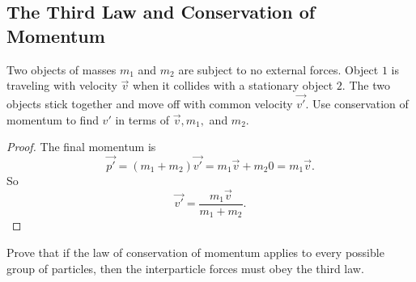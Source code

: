 
\subsection{The Third Law and Conservation of Momentum}

\begin{tcolorbox}[title=Problem 30, breakable]
    Two objects of masses $m_1$ and $m_2$
    are subject to no external forces. Object $1$
    is traveling with velocity $\vec{v}$ when 
    it collides with a stationary object $2$.
    The two objects stick together and move off 
    with common velocity $\vec{v'}$.
    Use conservation of momentum to find $v'$ in terms of $\vec{v},
    m_1,$ and $m_2$.
\end{tcolorbox}

\begin{proof}
    The final momentum is 
    \[\vec{p'} = (m_1 + m_2) \vec{v'} = m_1 \vec{v} + m_2 0 = m_1 \vec{v}.\]
    So 
    \[\vec{v'} = \frac{m_1 \vec{v}}{m_1 + m_2}.\]
\end{proof}


\begin{tcolorbox}[title=Problem 31, breakable]
    Prove that if the law of conservation of momentum applies 
    to every possible group of particles, then the interparticle forces 
    must obey the third law.
\end{tcolorbox}

